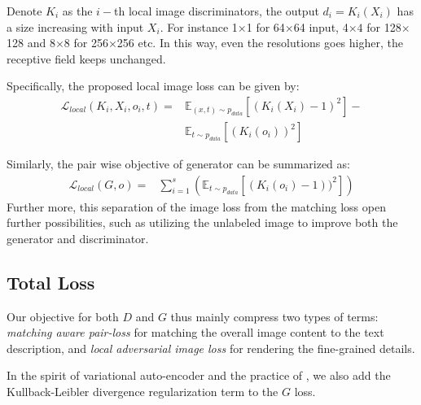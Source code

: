 \documentclass[10pt,twocolumn,letterpaper]{article}
\begin{document}
Denote $K_i$ as the $i-$th local image discriminators,  the output $d_i = K_i(X_i)$ has a size increasing with input $X_i$. For instance 1$\times$1 for 64$\times$64 input, 4$\times 4$ for 128$\times$128 and 8$\times 8$ for 256$\times$256 etc.  In this way, even the resolutions goes higher, the receptive field keeps unchanged. 

Specifically, the proposed local image loss can be given by:
\begin{equation}
\label{equ:local}
\begin{split}
\mathcal{L}_{local}(K_i, X_i, o_i, t )  = & \mathbb{E}_{(x, t) \sim p_{data}}[(K_i( {X_i}) - 1) ^ 2 ] - \\
&  \mathbb{E}_{t \sim p_{data}}[ (K_i( {o}_i))^2 ]  
\end{split}
\end{equation}

Similarly, the pair wise objective of generator can be summarized as:
\begin{equation}
\label{equ:pariG}
\begin{split}
\mathcal{L}_{local}(G, o)  = & \sum_{i=1}^{s} ( \mathbb{E}_{t \sim p_{data}}[ (K_i( {o}_i) - 1) )^2 ] )
\end{split}
\end{equation}
Further more, this separation of the image loss from the matching loss open further possibilities, such as utilizing the unlabeled image to improve both the generator and discriminator.



\subsection{Total Loss}

Our objective for both $D$ and $G$ thus mainly compress two types of terms: \textit{matching aware pair-loss} for matching the overall image content to the text description, and \textit{local adversarial image loss} for rendering the fine-grained details.

In the spirit of variational auto-encoder and the practice of \cite{han2017stackgan}, we also add the  Kullback-Leibler divergence regularization term to the $G$ loss.  %
\end{document}
